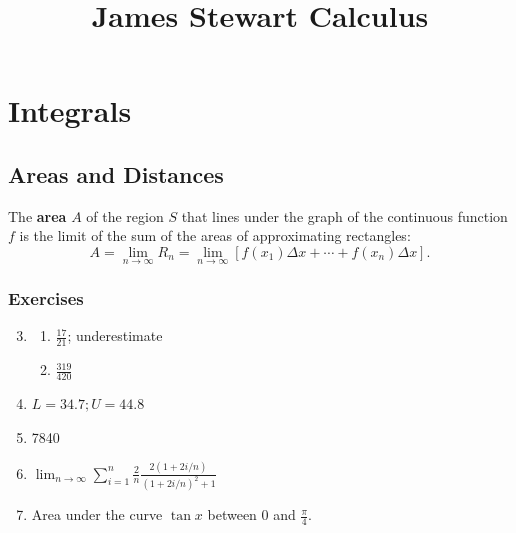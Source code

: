 \documentclass{article} \usepackage[margin=1in]{geometry}
\title{James Stewart Calculus} \author{} \date{}
\begin{document}
\maketitle
\setcounter{section}{3}
\section{Integrals}
\subsection{Areas and Distances}
\begin{definition*}
	The \textbf{area} $A$ of the region $S$ that lines under the graph
	of the continuous function $f$ is the limit of the sum of the areas
	of approximating rectangles:
	\[A=\lim_{n\to\infty}R_n=\lim_{n\to\infty}[f(x_1)\Delta
			x+\cdots+f(x_n)\Delta x].\]
\end{definition*}
\subsubsection*{Exercises}
\begin{enumerate}
	\setcounter{enumi}{2}
	\item
	      \begin{enumerate}
		      \item $\frac{17}{21}$; underestimate
		      \item $\frac{319}{420}$
	      \end{enumerate}
	      \setcounter{enumi}{12}
	\item $L=34.7; U=44.8$ \setcounter{enumi}{18}
	\item 7840 \setcounter{enumi}{20}
	\item
	      $\lim_{n\to\infty}\sum_{i=1}^{n}\frac{2}{n}\frac{2(1+2i/n)}{(1+2i/n)^2+1}$
	      \setcounter{enumi}{24}
	\item Area under the curve $\tan{x}$ between 0 and $\frac{\pi}{4}$.
\end{enumerate}
\end{document}
